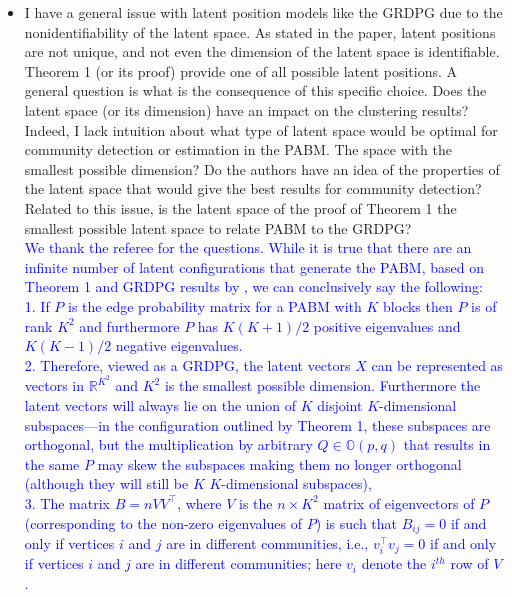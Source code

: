 \documentclass[
]{article}
\begin{document}
\begin{itemize}
\item
  I have a general issue with latent position models like the GRDPG due
  to the nonidentifiability of the latent space. As stated in the paper,
  latent positions are not unique, and not even the dimension of the
  latent space is identifiable. Theorem 1 (or its proof) provide one of
  all possible latent positions. A general question is what is the
  consequence of this specific choice. Does the latent space (or its
  dimension) have an impact on the clustering results? Indeed, I lack
  intuition about what type of latent space would be optimal for
  community detection or estimation in the PABM. The space with the
  smallest possible dimension? Do the authors have an idea of the
  properties of the latent space that would give the best results for
  community detection? Related to this issue, is the latent space of the
  proof of Theorem 1 the smallest possible latent space to relate PABM
  to the GRDPG?\\
  \textcolor{blue}{
  We thank the referee for the questions. 
  While it is true that there are an infinite number of latent configurations that generate the PABM, based on Theorem 1 and GRDPG results by \citet{rubindelanchy2017statistical}, we can conclusively say the following: 
  \\1. If $P$ is the edge probability matrix for a PABM with $K$
  blocks then $P$ is of rank $K^2$ and furthermore $P$ has $K (K + 1) /
  2$ positive eigenvalues and $K (K - 1) / 2$ negative eigenvalues. 
  \\2. Therefore, viewed as a GRDPG, the latent vectors $X$ can be
  represented as vectors in $\mathbb{R}^{K^2}$ and 
  $K^2$ is the smallest possible dimension. Furthermore the latent
  vectors will always lie on the union of $K$ disjoint $K$-dimensional subspaces---in the configuration outlined by Theorem 1, these subspaces are orthogonal, but the multiplication by arbitrary $Q \in \mathbb{O}(p, q)$ that results in the same $P$ may skew the subspaces making them no longer orthogonal (although they will still be $K$ $K$-dimensional subspaces), 
  \\3. The matrix $B = n V V^\top$, where $V$ is the $n \times K^2$
  matrix of eigenvectors of $P$ (corresponding to the non-zero
  eigenvalues of $P$) is such that $B_{ij} = 0$ if and only
  if vertices $i$ and $j$ are in different communities, i.e.,
  $v_i^{\top} v_j = 0$ if and only if vertices $i$ and $j$ are in
  different communities; here $v_i$ denote the $i^{th}$ row of $V$. 
}
\end{itemize}
\end{document}

